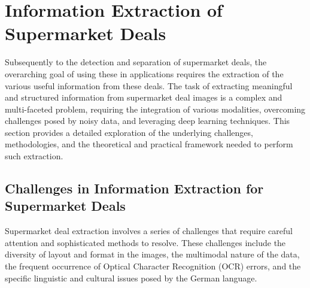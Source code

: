 \documentclass[11pt]{article}
\begin{document}
\section{Information Extraction of Supermarket Deals}
Subsequently to the detection and separation of supermarket deals, the overarching goal of using these in applications requires the extraction of the various useful information from these deals. 
The task of extracting meaningful and structured information from supermarket deal images is a complex and multi-faceted problem, requiring the integration of various modalities, overcoming challenges posed by noisy data, and leveraging deep learning techniques. This section provides a detailed exploration of the underlying challenges, methodologies, and the theoretical and practical framework needed to perform such extraction.

\subsection{Challenges in Information Extraction for Supermarket Deals}

Supermarket deal extraction involves a series of challenges that require careful attention and sophisticated methods to resolve. These challenges include the diversity of layout and format in the images, the multimodal nature of the data, the frequent occurrence of Optical Character Recognition (OCR) errors, and the specific linguistic and cultural issues posed by the German language.
\end{document}
